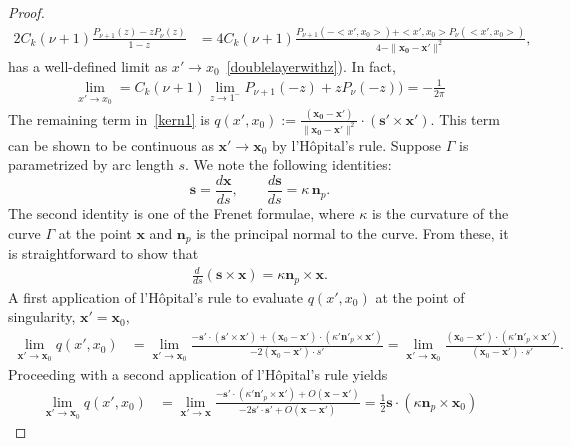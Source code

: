 \documentclass[final]{siamltex}
\newcommand{\C}{C_k}
\newcommand{\s}{s}
\begin{document}
\begin{proof}
\begin{align*}
2\C(\nu+1)\frac{P_{\nu+1}(z)-zP_{\nu}(z)}{1-z}&=4\C(\nu+1)\frac{P_{\nu+1}(-<x',x_0>)+<x',x_0>P_{\nu}(<x',x_0>)}{4-\|\mathbf{x_0}-\mathbf{x'}\|^2},
\end{align*}
has a well-defined limit as $x'\rightarrow
x_0$~\eqref{doublelayerwithz}). In fact,
\begin{align*}
\lim_{x'\rightarrow x_0}=\C(\nu+1)\lim_{z\rightarrow 1^-}P_{\nu+1}(-z)+zP_{\nu}(-z))=-\frac{1}{2\pi}
\end{align*}
The remaining term in~\eqref{kern1} is 
$
 q(x',x_0) := 
    \frac{(\mathbf{x_0}-\mathbf{x'})}{\|\mathbf{x_0}-\mathbf{x'}\|^2}
    \cdot \left( \mathbf{s}' \times {\mathbf x}' \right).
$
This term can be shown to be continuous as ${\mathbf x}' \rightarrow {\mathbf x_0}$ by l'H\^{o}pital's rule. Suppose $\Gamma$ is parametrized by arc length $s$.  We note the following identities:
\[
   {\mathbf s} = \frac{d{\mathbf x}}{ds}, \qquad \frac{d{\mathbf s}}{ds} = \kappa \, {\mathbf n}_p .
\]
The second identity is one of the Frenet formulae, where $\kappa$ is the curvature of the curve $\Gamma$ at the point ${\mathbf x}$ and ${\mathbf n}_p$ is the principal normal to the curve. 
From these, it is straightforward to show that 
\begin{align*}
  \frac{d \, }{ds} \left( {\mathbf s} \times {\mathbf x} \right)=
  \kappa {\mathbf n}_p \times {\mathbf x} . 
\end{align*}
A first application of l'H\^{o}pital's rule to evaluate $q(x',x_0)$ at the point of singularity, ${\mathbf x}' = {\mathbf x_0}$, 
\begin{align*}
   \lim_{{\mathbf x}' \rightarrow {\mathbf x_0}}q(x',x_0) 
      & = \lim_{{\mathbf x}' \rightarrow {\mathbf x_0}}  \frac{ -\mathbf{s}' \cdot \left( \mathbf{s}' \times {\mathbf x}' \right) 
                                                             + ({\mathbf x_0}-{\mathbf x}') \cdot \left( \kappa' {\mathbf n}'_p \times {\mathbf x}'  \right)}
                                                           { -2 ({\mathbf x_0} - {\mathbf x}') \cdot \s' } =  \lim_{{\mathbf x}' \rightarrow {\mathbf x_0}}  \frac{  ({\mathbf x_0}-{\mathbf x}') \cdot \left( \kappa' {\mathbf n}'_p \times {\mathbf x}'  \right)}
                                                           { ({\mathbf x_0} - {\mathbf x}') \cdot \s' }. 
\end{align*}
Proceeding with a second application of l'H\^{o}pital's rule yields
\begin{align*}
   \lim_{{\mathbf x}' \rightarrow {\mathbf x_0}} q(x',x_0)  
      & =   \lim_{{\mathbf x}' \rightarrow {\mathbf x}}  \frac{  -\mathbf{s'} \cdot 
                                                                 \left( \kappa' {\mathbf n}'_p \times {\mathbf x}'  \right) + O({\mathbf x}-{\mathbf x}')}
                                                           { -2{\mathbf s}' \cdot \mathbf{s}' + O({\mathbf x}-{\mathbf x}')}  = \frac{1}{2} \mathbf{s} \cdot  \left( \kappa {\mathbf n}_p \times {\mathbf x_0}  \right) 
\end{align*}
\end{proof}
\end{document}
